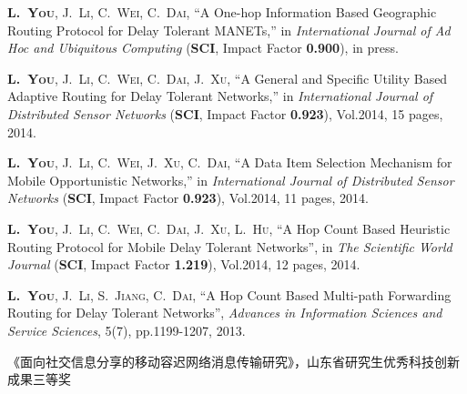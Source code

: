 \begin{publications}{99}
%
%
\item\textsc{\textbf{L.~You}, J.~Li, C.~Wei, C.~Dai}, ``A One-hop Information Based Geographic Routing Protocol for Delay Tolerant MANETs,'' in \textit{International Journal of Ad Hoc and Ubiquitous Computing} (\textbf{SCI}, Impact Factor \textbf{0.900}), in press.



%
\item\textsc{\textbf{L.~You}, J.~Li, C.~Wei, C.~Dai, J.~Xu}, ``A General and Specific Utility Based Adaptive Routing for Delay Tolerant Networks,'' in \textit{International Journal of Distributed Sensor Networks} (\textbf{SCI}, Impact Factor \textbf{0.923}), Vol.2014, 15 pages, 2014.


%
\item\textsc{\textbf{L.~You}, J.~Li, C.~Wei, J.~Xu, C.~Dai}, ``A Data Item Selection Mechanism for Mobile Opportunistic Networks,'' in \textit{International Journal of Distributed Sensor Networks} (\textbf{SCI}, Impact Factor \textbf{0.923}), Vol.2014, 11 pages, 2014.


%
\item\textsc{\textbf{L.~You}, J.~Li, C.~Wei, C.~Dai, J.~Xu, L.~Hu}, ``A Hop Count Based Heuristic Routing Protocol for Mobile Delay Tolerant Networks'', in \textit{The Scientific World Journal} (\textbf{SCI}, Impact Factor \textbf{1.219}), Vol.2014, 12 pages, 2014.


%
\item\textsc{\textbf{L.~You}, J.~Li, S.~Jiang, C.~Dai}, ``A Hop Count Based Multi-path Forwarding Routing for Delay Tolerant Networks'', {\it Advances in Information Sciences and Service Sciences}, 5(7), pp.1199-1207, 2013.


\item 《面向社交信息分享的移动容迟网络消息传输研究》，山东省研究生优秀科技创新成果三等奖
    
\end{publications}


